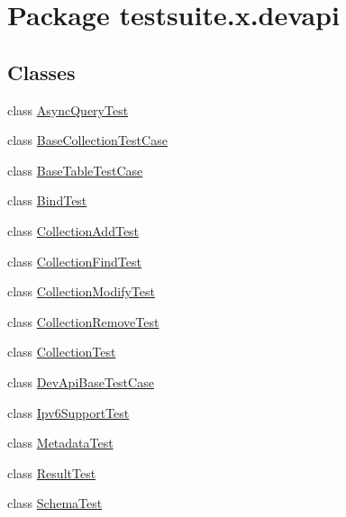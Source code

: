 \hypertarget{namespacetestsuite_1_1x_1_1devapi}{}\section{Package testsuite.\+x.\+devapi}
\label{namespacetestsuite_1_1x_1_1devapi}
\subsection*{Classes}
\begin{DoxyCompactItemize}
\item 
class \mbox{\hyperlink{classtestsuite_1_1x_1_1devapi_1_1_async_query_test}{Async\+Query\+Test}}
\item 
class \mbox{\hyperlink{classtestsuite_1_1x_1_1devapi_1_1_base_collection_test_case}{Base\+Collection\+Test\+Case}}
\item 
class \mbox{\hyperlink{classtestsuite_1_1x_1_1devapi_1_1_base_table_test_case}{Base\+Table\+Test\+Case}}
\item 
class \mbox{\hyperlink{classtestsuite_1_1x_1_1devapi_1_1_bind_test}{Bind\+Test}}
\item 
class \mbox{\hyperlink{classtestsuite_1_1x_1_1devapi_1_1_collection_add_test}{Collection\+Add\+Test}}
\item 
class \mbox{\hyperlink{classtestsuite_1_1x_1_1devapi_1_1_collection_find_test}{Collection\+Find\+Test}}
\item 
class \mbox{\hyperlink{classtestsuite_1_1x_1_1devapi_1_1_collection_modify_test}{Collection\+Modify\+Test}}
\item 
class \mbox{\hyperlink{classtestsuite_1_1x_1_1devapi_1_1_collection_remove_test}{Collection\+Remove\+Test}}
\item 
class \mbox{\hyperlink{classtestsuite_1_1x_1_1devapi_1_1_collection_test}{Collection\+Test}}
\item 
class \mbox{\hyperlink{classtestsuite_1_1x_1_1devapi_1_1_dev_api_base_test_case}{Dev\+Api\+Base\+Test\+Case}}
\item 
class \mbox{\hyperlink{classtestsuite_1_1x_1_1devapi_1_1_ipv6_support_test}{Ipv6\+Support\+Test}}
\item 
class \mbox{\hyperlink{classtestsuite_1_1x_1_1devapi_1_1_metadata_test}{Metadata\+Test}}
\item 
class \mbox{\hyperlink{classtestsuite_1_1x_1_1devapi_1_1_result_test}{Result\+Test}}
\item 
class \mbox{\hyperlink{classtestsuite_1_1x_1_1devapi_1_1_schema_test}{Schema\+Test}}

\end{DoxyCompactItemize}

